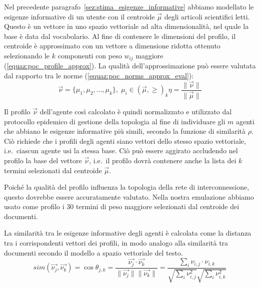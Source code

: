 Nel precedente paragrafo~\ref{sez:stima_esigenze_informative} abbiamo modellato le esigenze informative di un utente con il centroide $\vec{\mu}$ degli articoli scientifici letti. Questo è un vettore in uno spazio vettoriale ad alta dimensionalità, nel quale la base è data dal vocabolario. Al fine di contenere le dimensioni del profilo, il centroide è approssimato con un vettore a dimensione ridotta ottenuto selezionando le $k$ componenti con peso $w_{ij}$ maggiore (\ref{equaz:poc_profile_approx}). La qualità dell'approssimazione può essere valutata dal rapporto tra le norme (\ref{equaz:poc_norms_approx_eval}):
\begin{subequations}
\begin{equation}
   \vec{\nu} = \{\mu_1, \mu_2, \ldots, \mu_k\}, \; \mu_i \in (\vec{\mu}, \ge)_k
   \label{equaz:poc_profile_approx}
\end{equation}
\begin{equation}
   \eta = \frac{\|\vec{\nu}\|}{\|\vec{\mu}\|}
   \label{equaz:poc_norms_approx_eval}
\end{equation}
\end{subequations}

Il profilo $\vec{\nu}$ dell'agente così calcolato è quindi normalizzato e utilizzato dal protocollo epidemico di gestione della topologia al fine di individuare gli $m$ agenti che abbiano le esigenze informative più simili, secondo la funzione di similarità $\rho$. Ciò richiede che i profili degli agenti siano vettori dello stesso spazio vettoriale, i.e.\ ciascun agente usi la stessa base. Ciò può essere aggirato accludendo nel profilo la base del vettore $\vec{\nu}$, i.e.\ il profilo dovrà contenere anche la lista dei $k$ termini selezionati dal centroide $\vec{\mu}$.

Poiché la qualità del profilo influenza la topologia della rete di interconnessione, questo dovrebbe essere accuratamente valutato. Nella nostra emulazione abbiamo usato come profilo i $30$ termini di peso maggiore selezionati dal centroide dei documenti.

La similarità tra le esigenze informative degli agenti è calcolata come la distanza tra i corrispondenti vettori dei profili, in modo analogo alla similarità tra documenti secondo il modello a spazio vettoriale del testo.
\begin{equation}
 sim(\vec{\nu_j},\vec{\nu_k}) = \cos \theta_{j,k} = \frac{\vec{\nu_j} \cdot \vec{\nu_k}}{\|\vec{\nu_j}\| \|\vec{\nu_k}\|} = \frac{\sum_i \nu_{i,j} \cdot \nu_{i,k}}{\sqrt{\sum_i \nu_{i,j}^2 } \sqrt{\sum_i \nu_{i,k}^2 }  }
\label{equaz:poc_profile_similarity}
\end{equation}


